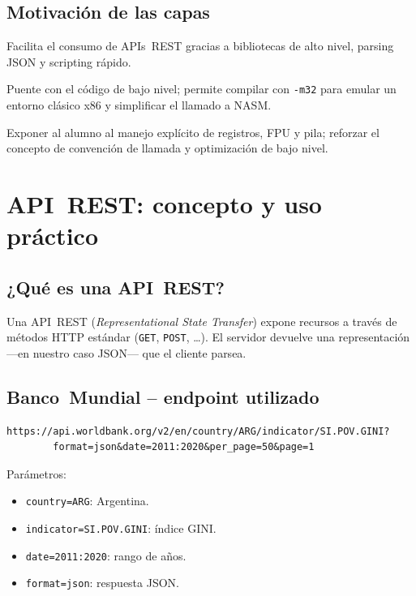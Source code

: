 \documentclass[a4paper,12pt]{article}
\begin{document}
\subsection{Motivación de las capas}
\begin{description}[leftmargin=2em]
  \item[Python.] Facilita el consumo de APIs REST gracias a bibliotecas de alto nivel, parsing JSON y scripting rápido.
  \item[C (32 bits).] Puente con el código de bajo nivel; permite compilar con \texttt{-m32} para emular un entorno clásico x86 y simplificar el llamado a NASM.
  \item[Ensamblador NASM.] Exponer al alumno al manejo explícito de registros, FPU y pila; reforzar el concepto de convención de llamada y optimización de bajo nivel.
\end{description}


\section{API REST: concepto y uso práctico}
\subsection{¿Qué es una API REST?}
Una API REST (\emph{Representational State Transfer}) expone recursos a través de
métodos HTTP estándar (\texttt{GET}, \texttt{POST}, \dots). El servidor devuelve
una representación —en nuestro caso JSON— que el cliente parsea.

\subsection{Banco Mundial – endpoint utilizado}
\begin{lstlisting}[language={},caption={URL solicitada}]
https://api.worldbank.org/v2/en/country/ARG/indicator/SI.POV.GINI?
        format=json&date=2011:2020&per_page=50&page=1
\end{lstlisting}
Parámetros:
\begin{itemize}
  \item \texttt{country=ARG}: Argentina.
  \item \texttt{indicator=SI.POV.GINI}: índice GINI.
  \item \texttt{date=2011:2020}: rango de años.
  \item \texttt{format=json}: respuesta JSON.
\end{itemize}
\end{document}

